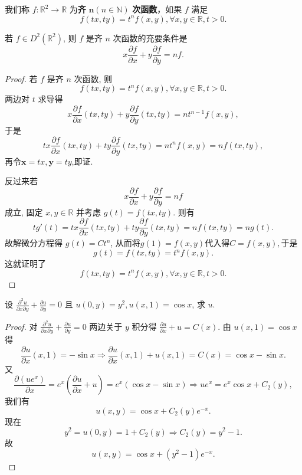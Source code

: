 \documentclass[../../main.tex]{subfiles}%
\begin{document}
\begin{definition}
我们称 \( f : \mathbb{R}^2 \to \mathbb{R} \) 为\textbf{齐} \( \boldsymbol{n}( n \in \mathbb{N} )\) \textbf{次函数}，如果 \( f \) 满足
\[
f(tx, ty) = t^n f(x, y), \forall x, y \in \mathbb{R}, t > 0.
\]
\end{definition}

\begin{proposition}[齐次函数基本性质]\label{proposition:齐次函数基本性质}
若 \( f \in D^2(\mathbb{R}^2) \), 则 \( f \) 是齐 \( n \) 次函数的充要条件是
\[
x \frac{\partial f}{\partial x} + y \frac{\partial f}{\partial y} = n f.
\]
\end{proposition}
\begin{proof}

若 \( f \) 是齐 \( n \) 次函数, 则
\[
f(tx, ty) = t^n f(x, y), \forall x, y \in \mathbb{R}, t > 0.
\]
两边对 \( t \) 求导得
\[
x \frac{\partial f}{\partial x}(tx, ty) + y \frac{\partial f}{\partial y}(tx, ty) = n t^{n - 1} f(x, y),
\]
于是
\[
tx \frac{\partial f}{\partial x}(tx, ty) + ty \frac{\partial f}{\partial y}(tx, ty) = n t^n f(x, y) = n f(tx, ty),
\]
再令$\mathbf{x}=tx,\mathbf{y}=ty$,即证.

反过来若
\[
x \frac{\partial f}{\partial x} + y \frac{\partial f}{\partial y} = n f
\]
成立, 固定 \( x, y \in \mathbb{R} \) 并考虑 \( g(t) = f(tx, ty) \). 则有
\[
t g'(t) = tx \frac{\partial f}{\partial x}(tx, ty) + ty \frac{\partial f}{\partial y}(tx, ty) = n f(tx, ty) = n g(t).
\]
故解微分方程得 \( g(t) = C t^n \), 从而将$g(1) = f(x, y)$代入得$C=f(x,y),$于是
\[
g(t)=f(tx, ty) = t^n f(x, y).
\]
这就证明了
\[
f(tx, ty) = t^n f(x, y), \forall x, y \in \mathbb{R}, t > 0.
\]

\end{proof}

\begin{example}
设 \( \frac{\partial^2 u}{\partial x \partial y} + \frac{\partial u}{\partial y} = 0 \) 且 \( u(0, y) = y^2, u(x, 1) = \cos x \), 求 \( u \).
\end{example}
\begin{proof}

对 \( \frac{\partial^2 u}{\partial x \partial y} + \frac{\partial u}{\partial y} = 0 \) 两边关于 \( y \) 积分得 \( \frac{\partial u}{\partial x} + u = C(x) \). 由 \( u(x, 1) = \cos x \) 得
\[
\frac{\partial u}{\partial x}(x,1)=-\sin x\Rightarrow \frac{\partial u}{\partial x}\left( x,1 \right) +u\left( x,1 \right) =C(x)=\cos x-\sin x.
\]
又
\[
\frac{\partial (u e^x)}{\partial x} = e^x \left( \frac{\partial u}{\partial x} + u \right) = e^x (\cos x - \sin x) \Rightarrow u e^x = e^x \cos x + C_2(y),
\]
我们有
\[
u(x, y) = \cos x + C_2(y) e^{-x}.
\]
现在
\[
y^2 = u(0, y) = 1 + C_2(y) \Rightarrow C_2(y) = y^2 - 1.
\]
故
\[
u(x, y) = \cos x + (y^2 - 1) e^{-x}.
\]

\end{proof}
\end{document}
